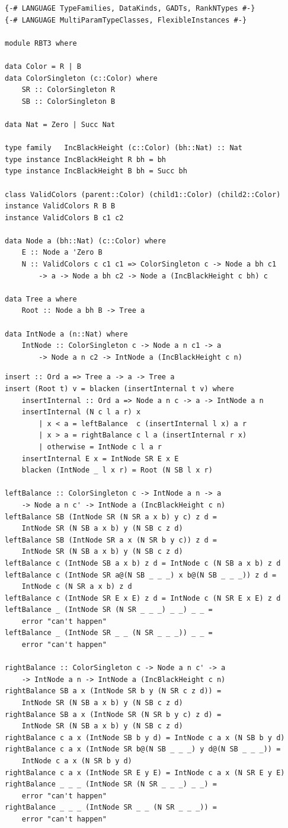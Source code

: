\documentclass{tmr}
\begin{document}
\begin{Verbatim}
{-# LANGUAGE TypeFamilies, DataKinds, GADTs, RankNTypes #-}
{-# LANGUAGE MultiParamTypeClasses, FlexibleInstances #-}

module RBT3 where

data Color = R | B
data ColorSingleton (c::Color) where
    SR :: ColorSingleton R
    SB :: ColorSingleton B

data Nat = Zero | Succ Nat

type family   IncBlackHeight (c::Color) (bh::Nat) :: Nat
type instance IncBlackHeight R bh = bh
type instance IncBlackHeight B bh = Succ bh

class ValidColors (parent::Color) (child1::Color) (child2::Color)
instance ValidColors R B B
instance ValidColors B c1 c2

data Node a (bh::Nat) (c::Color) where
    E :: Node a 'Zero B
    N :: ValidColors c c1 c1 => ColorSingleton c -> Node a bh c1
        -> a -> Node a bh c2 -> Node a (IncBlackHeight c bh) c

data Tree a where
    Root :: Node a bh B -> Tree a

data IntNode a (n::Nat) where
    IntNode :: ColorSingleton c -> Node a n c1 -> a
        -> Node a n c2 -> IntNode a (IncBlackHeight c n)
\end{Verbatim}

\begin{Verbatim}
insert :: Ord a => Tree a -> a -> Tree a
insert (Root t) v = blacken (insertInternal t v) where
    insertInternal :: Ord a => Node a n c -> a -> IntNode a n
    insertInternal (N c l a r) x
        | x < a = leftBalance  c (insertInternal l x) a r
        | x > a = rightBalance c l a (insertInternal r x)
        | otherwise = IntNode c l a r
    insertInternal E x = IntNode SR E x E
    blacken (IntNode _ l x r) = Root (N SB l x r)

leftBalance :: ColorSingleton c -> IntNode a n -> a
    -> Node a n c' -> IntNode a (IncBlackHeight c n)
leftBalance SB (IntNode SR (N SR a x b) y c) z d =
    IntNode SR (N SB a x b) y (N SB c z d)
leftBalance SB (IntNode SR a x (N SR b y c)) z d =
    IntNode SR (N SB a x b) y (N SB c z d)
leftBalance c (IntNode SB a x b) z d = IntNode c (N SB a x b) z d
leftBalance c (IntNode SR a@(N SB _ _ _) x b@(N SB _ _ _)) z d =
    IntNode c (N SR a x b) z d
leftBalance c (IntNode SR E x E) z d = IntNode c (N SR E x E) z d
leftBalance _ (IntNode SR (N SR _ _ _) _ _) _ _ =
    error "can't happen"
leftBalance _ (IntNode SR _ _ (N SR _ _ _)) _ _ =
    error "can't happen"

rightBalance :: ColorSingleton c -> Node a n c' -> a
    -> IntNode a n -> IntNode a (IncBlackHeight c n)
rightBalance SB a x (IntNode SR b y (N SR c z d)) =
    IntNode SR (N SB a x b) y (N SB c z d)
rightBalance SB a x (IntNode SR (N SR b y c) z d) =
    IntNode SR (N SB a x b) y (N SB c z d)
rightBalance c a x (IntNode SB b y d) = IntNode c a x (N SB b y d)
rightBalance c a x (IntNode SR b@(N SB _ _ _) y d@(N SB _ _ _)) =
    IntNode c a x (N SR b y d)
rightBalance c a x (IntNode SR E y E) = IntNode c a x (N SR E y E)
rightBalance _ _ _ (IntNode SR (N SR _ _ _) _ _) =
    error "can't happen"
rightBalance _ _ _ (IntNode SR _ _ (N SR _ _ _)) =
    error "can't happen"
\end{Verbatim}
\end{document}
